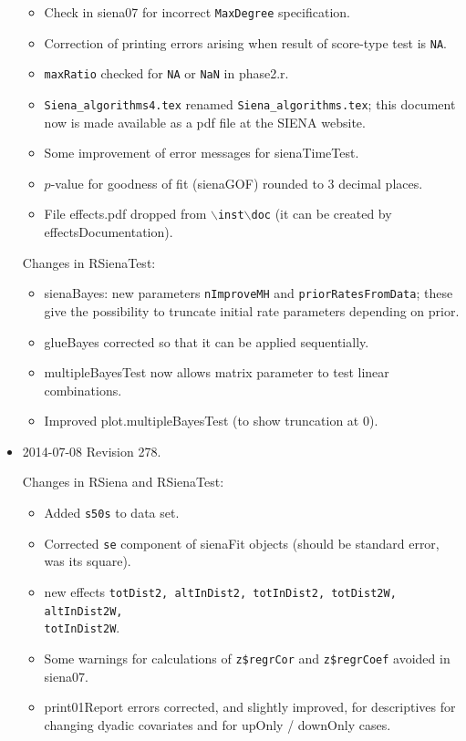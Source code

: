 \documentclass[a4paper,fleqn,11pt]{article}
\newcommand{\+}{\, + \,}
\newcommand{\sfn}[1]{\textsf{#1}}
\newcommand{\SI}{{\sf SIENA }}
\begin{document}
\begin{small}
\begin{itemize}
\begin{itemize}
   \item Check in \sfn{siena07} for incorrect \texttt{MaxDegree} specification.
   \item Correction of printing errors arising when result of score-type test is \texttt{NA}.
   \item \texttt{maxRatio} checked for \texttt{NA} or \texttt{NaN} in \sfn{phase2.r}.
   \item \texttt{Siena\_algorithms4.tex} renamed \texttt{Siena\_algorithms.tex};
         this document now is made available as a pdf file at the \SI website.
   \item Some improvement of error messages for \sfn{sienaTimeTest}.
   \item $p$-value for goodness of fit (\sfn{sienaGOF}) rounded to 3 decimal places.
   \item File \sfn{effects.pdf} dropped from \texttt{{$\backslash$}inst{$\backslash$}doc}
          (it can be created by \sfn{effectsDocumentation}).
\end{itemize}
Changes in \textsf{RSienaTest}:
\begin{itemize}
   \item \sfn{sienaBayes}: new parameters \texttt{nImproveMH} and \texttt{priorRatesFromData};
      these give the possibility to truncate initial rate parameters depending on prior.
   \item \sfn{glueBayes} corrected so that it can be applied sequentially.
   \item \sfn{multipleBayesTest} now allows matrix parameter to test
     linear combinations.
   \item Improved \sfn{plot.multipleBayesTest} (to show truncation at 0).
\end{itemize}

\item 2014-07-08  Revision 278.

Changes in \textsf{RSiena} and \textsf{RSienaTest}:
\begin{itemize}
   \item Added \texttt{s50s} to data set.
   \item Corrected \texttt{se} component of \sfn{sienaFit} objects
     (should be standard error, was its square).
   \item new effects \texttt{totDist2, altInDist2, totInDist2,
     totDist2W, altInDist2W,\\
      totInDist2W}.
   \item Some warnings for calculations of \texttt{z\$regrCor}
   and \texttt{z\$regrCoef} avoided in \sfn{siena07}.
   \item \sfn{print01Report} errors corrected, and slightly improved,
    for descriptives for changing dyadic covariates
    and for upOnly / downOnly cases.
\end{itemize}


\end{itemize}
\end{small}
\end{document}
